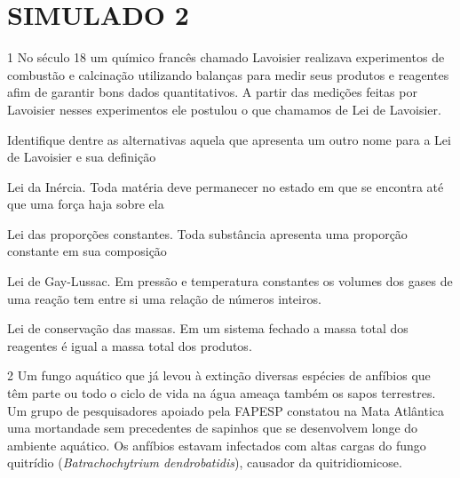 {{\chapter{SIMULADO 2}

\num{1}
  No século 18 um químico francês chamado Lavoisier realizava
  experimentos de combustão e calcinação utilizando balanças para medir
  seus produtos e reagentes afim de garantir bons dados quantitativos. A
  partir das medições feitas por Lavoisier nesses experimentos ele
  postulou o que chamamos de Lei de Lavoisier.


Identifique dentre as alternativas aquela que apresenta um outro nome
para a Lei de Lavoisier e sua definição

\begin{escolha}
\item
  Lei da Inércia. Toda matéria deve permanecer no estado em que se
  encontra até que uma força haja sobre ela
\item
  Lei das proporções constantes. Toda substância apresenta uma proporção
  constante em sua composição
\item
  Lei de Gay-Lussac. Em pressão e temperatura constantes os volumes dos
  gases de uma reação tem entre si uma relação de números inteiros.
\item
  Lei de conservação das massas. Em um sistema fechado a massa total dos
  reagentes é igual a massa total dos produtos.
\end{escolha}


\num{2}
  Um fungo aquático que já levou à extinção diversas espécies de
  anfíbios que têm parte ou todo o ciclo de vida na água ameaça também
  os sapos terrestres. Um grupo de pesquisadores apoiado pela FAPESP
  constatou na Mata Atlântica uma mortandade sem precedentes de sapinhos
  que se desenvolvem longe do ambiente aquático. Os anfíbios estavam
  infectados com altas cargas do fungo quitrídio (\emph{Batrachochytrium
  dendrobatidis}), causador da quitridiomicose.

}}
